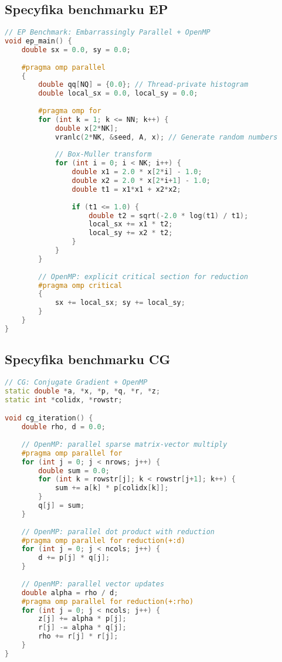 \subsection{Specyfika benchmarku EP}
\begin{lstlisting}[language=C++, style=VS2017,  caption={Implementacja benchmarku EP w języku C++ z OpenMP}, label={lst:ep_openmp}]
// EP Benchmark: Embarrassingly Parallel + OpenMP
void ep_main() {
    double sx = 0.0, sy = 0.0;
    
    #pragma omp parallel
    {
        double qq[NQ] = {0.0}; // Thread-private histogram
        double local_sx = 0.0, local_sy = 0.0;
        
        #pragma omp for
        for (int k = 1; k <= NN; k++) {
            double x[2*NK];
            vranlc(2*NK, &seed, A, x); // Generate random numbers
            
            // Box-Muller transform
            for (int i = 0; i < NK; i++) {
                double x1 = 2.0 * x[2*i] - 1.0;
                double x2 = 2.0 * x[2*i+1] - 1.0;
                double t1 = x1*x1 + x2*x2;
                
                if (t1 <= 1.0) {
                    double t2 = sqrt(-2.0 * log(t1) / t1);
                    local_sx += x1 * t2;
                    local_sy += x2 * t2;
                }
            }
        }
        
        // OpenMP: explicit critical section for reduction
        #pragma omp critical
        {
            sx += local_sx; sy += local_sy;
        }
    }
}
\end{lstlisting}

\subsection{Specyfika benchmarku CG}
\begin{lstlisting}[language=C++, style=VS2017,  caption={Implementacja benchmarku CG w języku C++ z OpenMP}, label={lst:cg_openmp}]
// CG: Conjugate Gradient + OpenMP 
static double *a, *x, *p, *q, *r, *z;
static int *colidx, *rowstr;

void cg_iteration() {
    double rho, d = 0.0;
    
    // OpenMP: parallel sparse matrix-vector multiply
    #pragma omp parallel for
    for (int j = 0; j < nrows; j++) {
        double sum = 0.0;
        for (int k = rowstr[j]; k < rowstr[j+1]; k++) {
            sum += a[k] * p[colidx[k]];
        }
        q[j] = sum;
    }
    
    // OpenMP: parallel dot product with reduction
    #pragma omp parallel for reduction(+:d)
    for (int j = 0; j < ncols; j++) {
        d += p[j] * q[j];
    }
    
    // OpenMP: parallel vector updates
    double alpha = rho / d;
    #pragma omp parallel for reduction(+:rho)
    for (int j = 0; j < ncols; j++) {
        z[j] += alpha * p[j];
        r[j] -= alpha * q[j];
        rho += r[j] * r[j];
    }
}
\end{lstlisting}

